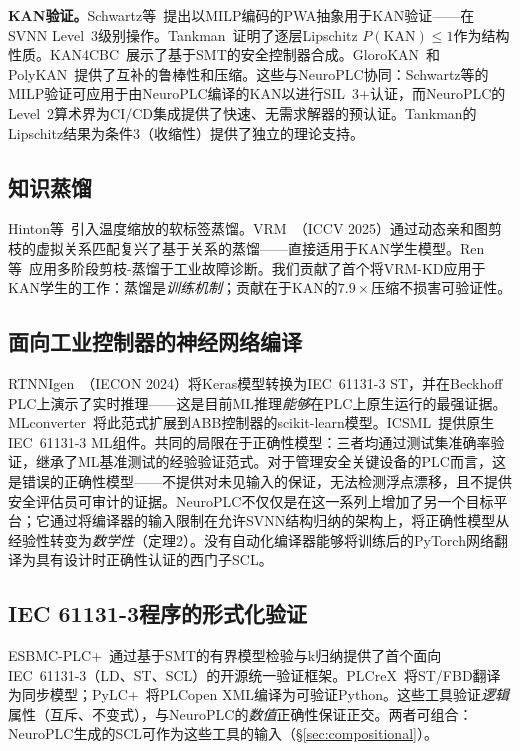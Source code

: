 \documentclass[journal,onecolumn]{IEEEtran}
\newcommand{\neuroplc}{NeuroPLC\xspace}
\theoremstyle{definition}
\theoremstyle{plain}
\theoremstyle{remark}
\begin{document}
\textbf{KAN验证。}Schwartz等~\cite{schwartz2026optimal}提出以MILP编码的PWA抽象用于KAN验证——在SVNN Level~3级别操作。Tankman~\cite{tankman2026lipschitz}证明了逐层Lipschitz $P(\text{KAN})\leq 1$作为结构性质。KAN4CBC~\cite{zhang2025kan4cbc}展示了基于SMT的安全控制器合成。GloroKAN~\cite{glorokan2025}和PolyKAN~\cite{polykan2025}提供了互补的鲁棒性和压缩。这些与\neuroplc{}协同：Schwartz等的MILP验证可应用于由\neuroplc{}编译的KAN以进行SIL~3+认证，而\neuroplc{}的Level~2算术界为CI/CD集成提供了快速、无需求解器的预认证。Tankman的Lipschitz结果为条件3（收缩性）提供了独立的理论支持。

\subsection{知识蒸馏}

Hinton等~\cite{hinton2015distilling}引入温度缩放的软标签蒸馏。VRM~\cite{zhang2025vrm}（ICCV 2025）通过动态亲和图剪枝的虚拟关系匹配复兴了基于关系的蒸馏——直接适用于KAN学生模型。Ren等~\cite{ren2024lightweight}应用多阶段剪枝-蒸馏于工业故障诊断。我们贡献了首个将VRM-KD应用于KAN学生的工作：蒸馏是\textit{训练机制}；贡献在于KAN的$7.9\times$压缩不损害可验证性。

\subsection{面向工业控制器的神经网络编译}

RTNNIgen~\cite{rtnnigen2024}（IECON 2024）将Keras模型转换为IEC~61131-3 ST，并在Beckhoff PLC上演示了实时推理——这是目前ML推理\textit{能够}在PLC上原生运行的最强证据。MLconverter~\cite{mlconverter2025}将此范式扩展到ABB控制器的scikit-learn模型。ICSML~\cite{icsml2023}提供原生IEC~61131-3 ML组件。共同的局限在于正确性模型：三者均通过测试集准确率验证，继承了ML基准测试的经验验证范式。对于管理安全关键设备的PLC而言，这是错误的正确性模型——不提供对未见输入的保证，无法检测浮点漂移，且不提供安全评估员可审计的证据。\neuroplc{}不仅仅是在这一系列上增加了另一个目标平台；它通过将编译器的输入限制在允许SVNN结构归纳的架构上，将正确性模型从经验性转变为\textit{数学性}（定理2）。没有自动化编译器能够将训练后的PyTorch网络翻译为具有设计时正确性认证的西门子SCL。

\subsection{IEC 61131-3程序的形式化验证}
\label{sec:plc-verification}

ESBMC-PLC+~\cite{esbmc_plc_plus_2026}通过基于SMT的有界模型检验与k归纳提供了首个面向IEC~61131-3（LD、ST、SCL）的开源统一验证框架。PLCreX~\cite{werner2025plcrex}将ST/FBD翻译为同步模型；PyLC+~\cite{ebrahimi2025pylc}将PLCopen XML编译为可验证Python。这些工具验证\textit{逻辑}属性（互斥、不变式），与\neuroplc{}的\textit{数值}正确性保证正交。两者可组合：\neuroplc{}生成的SCL可作为这些工具的输入（{\S}\ref{sec:compositional}）。
\end{document}
